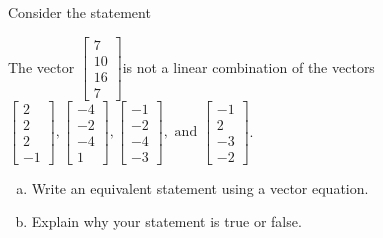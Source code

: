 
\begin{exerciseStatement}


Consider the statement 
\begin{center}\begin{minipage}{0.8\textwidth}
 The vector \( \left[\begin{array}{c}
7 \\
10 \\
16 \\
7
\end{array}\right] \)is not a linear combination of the vectors \( \left[\begin{array}{c}
2 \\
2 \\
2 \\
-1
\end{array}\right] , \left[\begin{array}{c}
-4 \\
-2 \\
-4 \\
1
\end{array}\right] , \left[\begin{array}{c}
-1 \\
-2 \\
-4 \\
-3
\end{array}\right] , \text{ and } \left[\begin{array}{c}
-1 \\
2 \\
-3 \\
-2
\end{array}\right] \). 
\end{minipage}\end{center}
    


\begin{enumerate}[(a)]
\item  Write an equivalent statement using a vector equation.
\item  Explain why your statement is true or false.
\end{enumerate}
    
\end{exerciseStatement}
    
